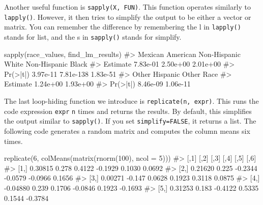 \documentclass[
  letterpaper,
]{latex/krantz}
\makeatletter
\newenvironment{Shaded}{\begin{snugshade}}{\end{snugshade}}
\newcommand{\AttributeTok}[1]{\textcolor[rgb]{0.40,0.45,0.13}{#1}}
\newcommand{\CommentTok}[1]{\textcolor[rgb]{0.37,0.37,0.37}{#1}}
\newcommand{\DecValTok}[1]{\textcolor[rgb]{0.68,0.00,0.00}{#1}}
\newcommand{\FunctionTok}[1]{\textcolor[rgb]{0.28,0.35,0.67}{#1}}
\newcommand{\NormalTok}[1]{\textcolor[rgb]{0.00,0.23,0.31}{#1}}
\newenvironment{kframe}{%
\medskip{}
\setlength{\fboxsep}{.8em}
 \def\at@end@of@kframe{}%
 \ifinner\ifhmode%
  \def\at@end@of@kframe{\end{minipage}}%
  \begin{minipage}{\columnwidth}%
 \fi\fi%
 \def\FrameCommand##1{\hskip\@totalleftmargin \hskip-\fboxsep
 \colorbox{shadecolor}{##1}\hskip-\fboxsep
     \hskip-\linewidth \hskip-\@totalleftmargin \hskip\columnwidth}%
 \MakeFramed {\advance\hsize-\width
   \@totalleftmargin\z@ \linewidth\hsize
   \@setminipage}}%
 {\par\unskip\endMakeFramed%
 \at@end@of@kframe}
\renewenvironment{Shaded}{\begin{kframe}}{\end{kframe}}
\makeatother
\begin{document}
Another useful function is
\texttt{sapply(X,\ FUN)}.
This function operates similarly to \texttt{lapply()}. However, it then
tries to simplify the output to be either a vector or matrix. You can
remember the difference by remembering the l in \texttt{lapply()} stands
for list, and the s in \texttt{sapply()} stands for simplify.

\begin{Shaded}
\begin{Highlighting}[]
\FunctionTok{sapply}\NormalTok{(race\_values, find\_lm\_results)}
\CommentTok{\#\textgreater{}          Mexican American Non{-}Hispanic White Non{-}Hispanic Black}
\CommentTok{\#\textgreater{} Estimate         7.83e{-}01           2.50e+00           2.01e+00}
\CommentTok{\#\textgreater{} Pr(\textgreater{}|t|)         3.97e{-}11          7.81e{-}138           1.83e{-}51}
\CommentTok{\#\textgreater{}          Other Hispanic Other Race}
\CommentTok{\#\textgreater{} Estimate       1.24e+00   1.93e+00}
\CommentTok{\#\textgreater{} Pr(\textgreater{}|t|)       8.46e{-}09   1.06e{-}11}
\end{Highlighting}
\end{Shaded}

The last loop-hiding function we introduce is
\texttt{replicate(n,\ expr)}.
This runs the code expression \texttt{expr} \texttt{n} times and returns
the results. By default, this simplifies the output similar to
\texttt{sapply()}. If you set \texttt{simplify=FALSE}, it returns a
list. The following code generates a random matrix and computes the
column means six times.

\begin{Shaded}
\begin{Highlighting}[]
\FunctionTok{replicate}\NormalTok{(}\DecValTok{6}\NormalTok{, }\FunctionTok{colMeans}\NormalTok{(}\FunctionTok{matrix}\NormalTok{(}\FunctionTok{rnorm}\NormalTok{(}\DecValTok{100}\NormalTok{), }\AttributeTok{ncol =} \DecValTok{5}\NormalTok{)))}
\CommentTok{\#\textgreater{}          [,1]   [,2]    [,3]    [,4]    [,5]    [,6]}
\CommentTok{\#\textgreater{} [1,]  0.30815  0.278  0.4122 {-}0.1929  0.1030  0.0692}
\CommentTok{\#\textgreater{} [2,]  0.21620  0.225 {-}0.2344 {-}0.0579 {-}0.0966  0.1656}
\CommentTok{\#\textgreater{} [3,]  0.00271 {-}0.147  0.0628  0.1923  0.3118  0.0875}
\CommentTok{\#\textgreater{} [4,] {-}0.04880  0.239  0.1706 {-}0.0846  0.1923 {-}0.1693}
\CommentTok{\#\textgreater{} [5,]  0.31253  0.183 {-}0.4122  0.5335  0.1544 {-}0.3784}
\end{Highlighting}
\end{Shaded}
\end{document}
